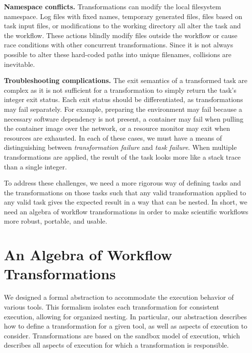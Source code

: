 \documentclass[conference]{IEEEtran}
\begin{document}
    {\bf Namespace conflicts.}
    Transformations can modify 
    the local filesystem namespace.
    Log files with fixed names, 
    temporary generated files, 
    files based on task input files, 
    or modifications to the working directory 
    all alter the task and the workflow.
    These actions blindly modify files 
    outside the workflow or cause 
    race conditions with other concurrent transformations.
    Since it is not always possible to alter these
    hard-coded paths into unique filenames,
    collisions are inevitable.
    
    {\bf Troubleshooting complications.}
    The exit semantics of a transformed task are complex 
    as it is not sufficient for a transformation to simply
    return the task's integer exit status.
    Each exit status should be differentiated,
    as transformations may fail separately.
    For example, preparing the environment may fail because a
    necessary software dependency is not present,
    a container may fail when pulling the container image over the network, or 
    a resource monitor may exit when resources are exhausted.
    In each of these cases, we must have a means of distinguishing
    between \emph{transformation failure} and \emph{task failure}.
    When multiple transformations are applied, the result of the
    task looks more like a stack trace than a single integer.


To address these challenges, we need a more
rigorous way of defining tasks and the transformations
on those tasks such that any valid transformation applied
to any valid task gives the expected result in a
way that can be nested.  In short, we need an algebra
of workflow transformations in order to make scientific
workflows more robust, portable, and usable.

%

\section{An Algebra of Workflow Transformations}

We designed a formal abstraction
to accommodate the execution behavior
of various tools. 
This formalism isolates each transformation 
for consistent execution,
allowing for organized nesting. 
In particular, our abstraction describes how to define 
a transformation for a given tool, 
as well as aspects of execution to consider. 
Transformations are based on the 
sandbox model of execution, 
which describes all aspects of execution 
for which a transformation is responsible.
\end{document}
